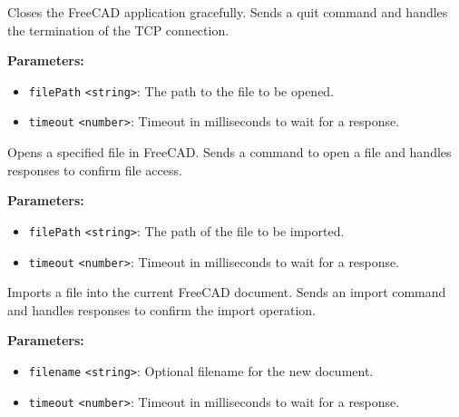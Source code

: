 \documentclass[12pt,a4paper]{article}
\begin{document}
\noindent Closes the FreeCAD application gracefully.
Sends a quit command and handles the termination of the TCP connection.

\vspace{5mm}
\noindent {}


\noindent \textbf{Parameters:}
\begin{itemize}
  \item \texttt{filePath} \texttt{<string>}: The path to the file to be opened.
  \item \texttt{timeout} \texttt{<number>}: Timeout in milliseconds to wait for a response.
\end{itemize}

\noindent Opens a specified file in FreeCAD.
Sends a command to open a file and handles responses to confirm file access.

\vspace{5mm}
\noindent {}


\noindent \textbf{Parameters:}
\begin{itemize}
  \item \texttt{filePath} \texttt{<string>}: The path of the file to be imported.
  \item \texttt{timeout} \texttt{<number>}: Timeout in milliseconds to wait for a response.
\end{itemize}

\noindent Imports a file into the current FreeCAD document.
Sends an import command and handles responses to confirm the import operation.

\vspace{5mm}
\noindent {}


\noindent \textbf{Parameters:}
\begin{itemize}
  \item \texttt{filename} \texttt{<string>}: Optional filename for the new document.
  \item \texttt{timeout} \texttt{<number>}: Timeout in milliseconds to wait for a response.
\end{itemize}
\end{document}
